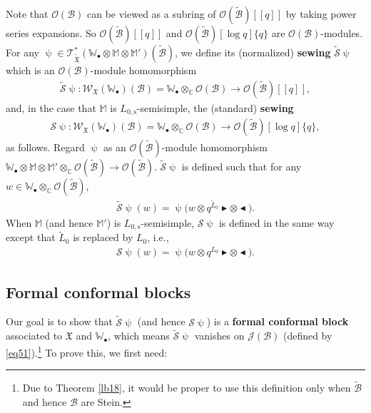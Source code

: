 \documentclass[12pt,a4paper,notitlepage]{article}
\theoremstyle{definition}
\theoremstyle{plain}
\newcommand{\fk}{\mathfrak}
\newcommand{\mc}{\mathcal}
\newcommand{\wtd}{\widetilde}
\newcommand{\scr}{\mathscr}
\newcommand{\blt}{\bullet}
\newcommand{\Wbb}{\mathbb W}
\newcommand{\Mbb}{\mathbb M}
\newcommand{\Cbb}{\mathbb C}
\newcommand{\btl}{\blacktriangleleft}
\newcommand{\btr}{\blacktriangleright}
\newcommand{\Lss}{L_{0,\mathrm{s}}}
\numberwithin{equation}{section}
\begin{document}
Note that $\scr O(\mc B)$ can be viewed as a subring of $\scr O(\wtd{\mc B})[[q]]$ by taking power series expansions. So $\scr O(\wtd{\mc B})[[q]]$ and $\scr O(\wtd{\mc B})[\log q]\{q\}$ are $\scr O(\mc B)$-modules.  For any $\uppsi\in\scr T_{\wtd{\fk X}}^*(\Wbb_\blt\otimes\Mbb\otimes\Mbb')(\wtd{\mc B})$, we define its (normalized) \textbf{sewing} $\wtd{\mc S}\uppsi$ which is an $\scr O(\mc B)$-module homomorphism \index{S@$\wtd{\mc S}\uppsi,\mc S\uppsi$}
\begin{align*}
\wtd{\mc S}\uppsi:\scr W_{\fk X}(\Wbb_\blt)(\mc B)=\Wbb_\blt\otimes_\Cbb\scr O(\mc B)\rightarrow\scr O(\wtd{\mc B})[[q]],
\end{align*}
and, in the case that $\Mbb$ is $\Lss$-semisimple, the (standard) \textbf{sewing}
\begin{align*}
\mc S\uppsi:\scr W_{\fk X}(\Wbb_\blt)(\mc B)=\Wbb_\blt\otimes_\Cbb\scr O(\mc B)\rightarrow\scr O(\wtd{\mc B})[\log q]\{q\},
\end{align*}
as follows. Regard $\uppsi$ as an $\scr O(\wtd{\mc B})$-module homomorphism $\Wbb_\blt\otimes\Mbb\otimes\Mbb'\otimes_\Cbb\scr O(\wtd{\mc B})\rightarrow \scr O(\wtd{\mc B})$. $\wtd{\mc S}\uppsi$ is defined such that for any  $w\in\Wbb_\blt\otimes_\Cbb\scr O(\wtd{\mc B})$,
\begin{align}
\wtd{\mc S}\uppsi(w)=\uppsi\big(w\otimes q^{\wtd L_0}\btr\otimes\btl\big).
\end{align}
When $\Mbb$ (and hence $\Mbb'$) is $\Lss$-semisimple, $\mc S\uppsi$ is defined in the same way except that $\wtd L_0$ is replaced by $L_0$, i.e.,
\begin{align}
{\mc S}\uppsi(w)=\uppsi\big(w\otimes q^{L_0}\btr\otimes\btl\big).\label{eq105}
\end{align}



\subsection*{Formal conformal blocks}

Our goal is to show that $\wtd{\mc S}\uppsi$ (and hence $\mc S\uppsi$) is a \textbf{formal conformal block} associated to $\fk X$ and $\Wbb_\blt$, which means $\wtd{\mc S}\uppsi$ vanishes on $\scr J(\mc B)$ (defined by \eqref{eq51}).\footnote{Due to Theorem \ref{lb18}, it would be proper to use this definition only when $\wtd{\mc B}$ and hence $\mc B$ are Stein.} To prove this, we first need:
\end{document}
